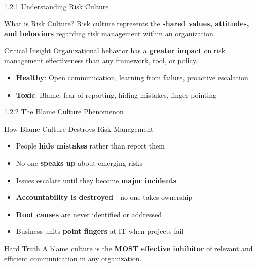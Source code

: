 \documentclass{beamer}
\begin{document}
	\begin{frame}{1.2.1 Understanding Risk Culture}
		\begin{block}{What is Risk Culture?}
			Risk culture represents the \textbf{shared values, attitudes, and behaviors} regarding risk management within an organization.
		\end{block}
		\begin{alertblock}{Critical Insight}
			Organizational behavior has a \textbf{greater impact} on risk management effectiveness than any framework, tool, or policy.
		\end{alertblock}
		\begin{itemize}
			\item \textbf{Healthy}: Open communication, learning from failure, proactive escalation
			\item \textbf{Toxic}: Blame, fear of reporting, hiding mistakes, finger-pointing
		\end{itemize}
	\end{frame}
	
	\begin{frame}{1.2.2 The Blame Culture Phenomenon}
		\begin{block}{How Blame Culture Destroys Risk Management}
			\begin{itemize}
				\item People \textbf{hide mistakes} rather than report them
				\item No one \textbf{speaks up} about emerging risks
				\item Issues escalate until they become \textbf{major incidents}
				\item \textbf{Accountability is destroyed} - no one takes ownership
				\item \textbf{Root causes} are never identified or addressed
				\item Business units \textbf{point fingers} at IT when projects fail
			\end{itemize}
		\end{block}
		\begin{alertblock}{Hard Truth}
			A blame culture is the \textbf{MOST effective inhibitor} of relevant and efficient communication in any organization.
		\end{alertblock}
	\end{frame}
	
\end{document}
